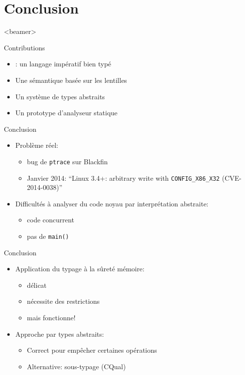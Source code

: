 \section{Conclusion}
  \begin{frame}<beamer>
   \tableofcontents[currentsection]
 \end{frame}


\begin{frame}{Contributions}
\begin{itemize}
\item \langname: un langage impératif bien typé
\item Une sémantique basée sur les lentilles
\item Un système de types abstraits
\item Un prototype d'analyseur statique
\end{itemize}
\end{frame}

\begin{frame}{Conclusion}
    \begin{itemize}
    \item Problème réel:
        \begin{itemize}
            \item bug de \texttt{ptrace} sur Blackfin
            \item Janvier 2014:
                \enquote{Linux 3.4+: arbitrary write with \texttt{CONFIG\_X86\_X32} (CVE-2014-0038)}
        \end{itemize}
    \item Difficultés à analyser du code noyau par interprétation abstraite:
        \begin{itemize}
            \item code concurrent
            \item pas de \texttt{main()}
        \end{itemize}
    \end{itemize}
\end{frame}

\begin{frame}{Conclusion}
    \begin{itemize}
    \item Application du typage à la sûreté mémoire:
        \begin{itemize}
            \item délicat
            \item nécessite des restrictions
            \item mais fonctionne!
        \end{itemize}
    \item Approche par types abstraits:
        \begin{itemize}
            \item Correct pour empêcher certaines opérations
            \item Alternative: sous-typage (CQual)
        \end{itemize}
    \end{itemize}
\end{frame}

